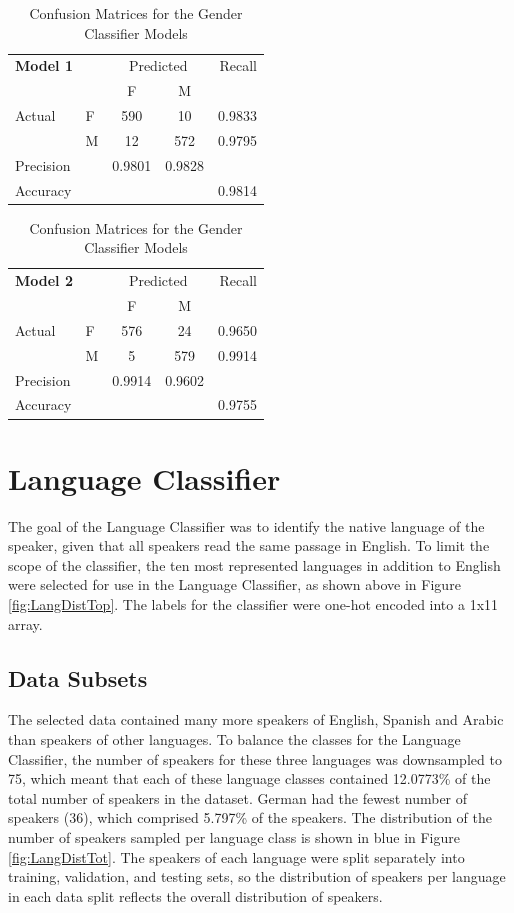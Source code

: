 \begin{table}[h]
\begin{center}
\caption{Confusion Matrices for the Gender Classifier Models}
\begin{tabular}{l l | c c r }
\multicolumn{2}{l}{\textbf{Model 1}} & \multicolumn{2}{c}{Predicted} & Recall \\
& & F & M &  \\ 
\cline{2-5}
Actual & F & 590 &  10 & 0.9833 \\
& M & 12 & 572 & 0.9795 \\  \hline
Precision&  & 0.9801 & 0.9828 \\ 
Accuracy & & &  & 0.9814 \\
\end{tabular}
\begin{tabular}{l l | c c r }
\multicolumn{2}{l}{\textbf{Model 2}} & \multicolumn{2}{c}{Predicted} & Recall \\
& & F& M &  \\ 
\cline{2-5}
Actual & F & 576 &  24 & 0.9650 \\
& M & 5 & 579 & 0.9914 \\  \hline
Precision&  & 0.9914 & 0.9602 \\ 
Accuracy & & &  & 0.9755 \\
\end{tabular}
\label{tab:GenConfusion}
\end{center}
\end{table} 

\section{Language Classifier}

The goal of the Language Classifier was to identify the native language of the speaker, given that all speakers read the same passage in English. To limit the scope of the classifier, the ten most represented languages in addition to English were selected for use in the Language Classifier, as shown above in Figure \ref{fig:LangDistTop}. The labels for the classifier were one-hot encoded into a 1x11 array.

\subsection{Data Subsets}
The selected data contained many more speakers of English, Spanish and Arabic than speakers of other languages. To balance the classes for the Language Classifier, the number of speakers for these three languages was downsampled to 75, which meant that each of these language classes contained 12.0773\% of the total number of speakers in the dataset. German had the fewest number of speakers (36), which comprised 5.797\% of the speakers. The distribution of the number of speakers sampled per language class is shown in blue in Figure \ref{fig:LangDistTot}. The speakers of each language were split separately into training, validation, and testing sets, so the distribution of speakers per language in each data split reflects the overall distribution of speakers.

